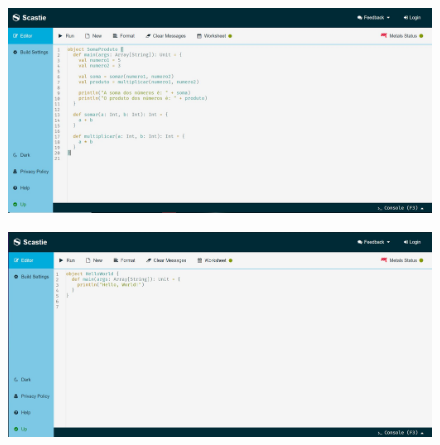     \begin{figure}[H]
		\centering
		\includegraphics[width=17.5cm]{Pictures/Ferr2.2.jpg}
		\caption{}
		\label{fig:ferr2}
	\end{figure}

	\begin{figure}[H]
		\centering
		\includegraphics[width=17.5cm]{Pictures/Ferr2.3.jpg}
		\caption{}
		\label{fig:ferr3}
	\end{figure}
